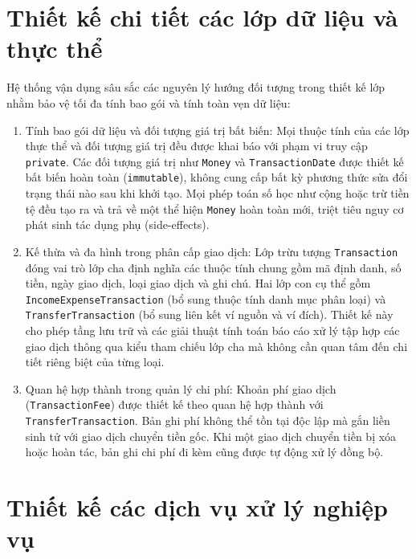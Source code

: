 \documentclass[a4paper,12pt]{report}
\newcommand{\passthrough}[1]{#1}
\begin{document}
\section{Thiết kế chi tiết các lớp dữ liệu và thực
thể}\label{thiux1ebft-kux1ebf-chi-tiux1ebft-cuxe1c-lux1edbp-dux1eef-liux1ec7u-vuxe0-thux1ef1c-thux1ec3}

Hệ thống vận dụng sâu sắc các nguyên lý hướng đối tượng trong thiết kế
lớp nhằm bảo vệ tối đa tính bao gói và tính toàn vẹn dữ liệu:

\begin{enumerate}
\def\labelenumi{\arabic{enumi}.}
\item
  Tính bao gói dữ liệu và đối tượng giá trị bất biến: Mọi thuộc tính của
  các lớp thực thể và đối tượng giá trị đều được khai báo với phạm vi
  truy cập \passthrough{\lstinline!private!}. Các đối tượng giá trị như
  \passthrough{\lstinline!Money!} và
  \passthrough{\lstinline!TransactionDate!} được thiết kế bất biến hoàn
  toàn (\passthrough{\lstinline!immutable!}), không cung cấp bất kỳ
  phương thức sửa đổi trạng thái nào sau khi khởi tạo. Mọi phép toán số
  học như cộng hoặc trừ tiền tệ đều tạo ra và trả về một thể hiện
  \passthrough{\lstinline!Money!} hoàn toàn mới, triệt tiêu nguy cơ phát
  sinh tác dụng phụ (side-effects).
\item
  Kế thừa và đa hình trong phân cấp giao dịch: Lớp trừu tượng
  \passthrough{\lstinline!Transaction!} đóng vai trò lớp cha định nghĩa
  các thuộc tính chung gồm mã định danh, số tiền, ngày giao dịch, loại
  giao dịch và ghi chú. Hai lớp con cụ thể gồm
  \passthrough{\lstinline!IncomeExpenseTransaction!} (bổ sung thuộc tính
  danh mục phân loại) và \passthrough{\lstinline!TransferTransaction!}
  (bổ sung liên kết ví nguồn và ví đích). Thiết kế này cho phép tầng lưu
  trữ và các giải thuật tính toán báo cáo xử lý tập hợp các giao dịch
  thông qua kiểu tham chiếu lớp cha mà không cần quan tâm đến chi tiết
  riêng biệt của từng loại.
\item
  Quan hệ hợp thành trong quản lý chi phí: Khoản phí giao dịch
  (\passthrough{\lstinline!TransactionFee!}) được thiết kế theo quan hệ
  hợp thành với \passthrough{\lstinline!TransferTransaction!}. Bản ghi
  phí không thể tồn tại độc lập mà gắn liền sinh tử với giao dịch chuyển
  tiền gốc. Khi một giao dịch chuyển tiền bị xóa hoặc hoàn tác, bản ghi
  chi phí đi kèm cũng được tự động xử lý đồng bộ.
\end{enumerate}

\section{Thiết kế các dịch vụ xử lý nghiệp
vụ}\label{thiux1ebft-kux1ebf-cuxe1c-dux1ecbch-vux1ee5-xux1eed-luxfd-nghiux1ec7p-vux1ee5}
\end{document}
